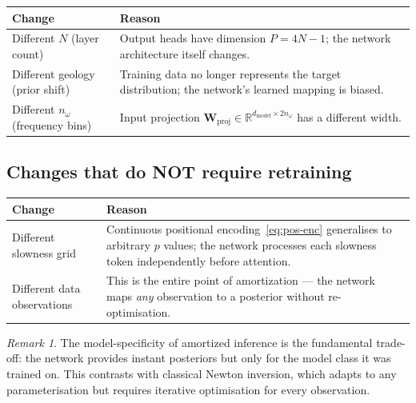 \documentclass[11pt,a4paper]{article}
\theoremstyle{plain}
\theoremstyle{remark}
\newtheorem{remark}{Remark}
\begin{document}
\begin{center}
\renewcommand{\arraystretch}{1.3}
\begin{tabular}{lp{8cm}}
  \toprule
  \textbf{Change} & \textbf{Reason} \\
  \midrule
  Different $N$ (layer count)
    & Output heads have dimension $P = 4N - 1$; the network architecture
      itself changes. \\
  Different geology (prior shift)
    & Training data no longer represents the target distribution;
      the network's learned mapping is biased. \\
  Different $n_\omega$ (frequency bins)
    & Input projection $\mathbf{W}_{\text{proj}} \in
      \mathbb{R}^{d_{\text{model}} \times 2n_\omega}$ has a different
      width. \\
  \bottomrule
\end{tabular}
\end{center}

\subsection{Changes that do NOT require retraining}

\begin{center}
\renewcommand{\arraystretch}{1.3}
\begin{tabular}{lp{8cm}}
  \toprule
  \textbf{Change} & \textbf{Reason} \\
  \midrule
  Different slowness grid
    & Continuous positional encoding~\eqref{eq:pos-enc} generalises to
      arbitrary $p$ values; the network processes each slowness token
      independently before attention. \\
  Different data observations
    & This is the entire point of amortization --- the network maps
      \emph{any} observation to a posterior without re-optimisation. \\
  \bottomrule
\end{tabular}
\end{center}

\begin{remark}
The model-specificity of amortized inference is the fundamental
trade-off: the network provides instant posteriors but only for the
model class it was trained on.  This contrasts with classical Newton
inversion, which adapts to any parameterisation but requires iterative
optimisation for every observation.
\end{remark}

\end{document}
